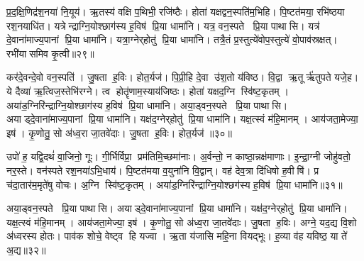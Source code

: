 प्र॒द॒क्षि॒णिद्र॑श॒नया॑ नि॒यूय॑। ऋ॒तस्य॑ वक्षि प॒थिभी॒ रजि॑ष्ठैः। होता॑ यक्षद्वन॒स्पति॑म॒भिहि। पि॒ष्टत॑मया॒ रभि॑ष्ठया रश॒नयाधि॑त। यत्रेन्द्राग्नि॒योश्छाग॑स्य ह॒विष॑ प्रि॒या धामा॑नि। यत्र॒ वन॒स्पते प्रि॒या पाथासि। यत्र॑ दे॒वाना॑माज्य॒पानां प्रि॒या धामा॑नि। यत्रा॒ग्नेर्‌होतु॑ प्रि॒या धामा॑नि। तत्रै॒तं प्र॒स्तुत्ये॑वोप॒स्तुत्ये॑ वो॒पाव॑स्रक्षत्। रभी॑यासमिव कृ॒त्वी॥२९॥

कर॑दे॒वन्दे॒वो वन॒स्पति॑। जु॒षता ह॒विः। होत॒र्यज॑। पि॒प्री॒हि दे॒वा उ॑श॒तो य॑विष्ठ। वि॒द्वा ऋ॒तूर्\mbox{}ऋ॑तुपते यजे॒ह। ये दैव्या॑ ऋ॒त्विज॒स्तेभि॑रग्ने। त्व होतॄ॑णाम॒स्याय॑जिष्ठः। होता॑ यक्षद॒ग्नि स्वि॑ष्ट॒कृतम्। अया॑ड॒ग्निरि॑न्द्राग्नि॒योश्छाग॑स्य ह॒विष॑ प्रि॒या धामा॑नि। अया॒ड्वन॒स्पते प्रि॒या पाथासि। अयाड्दे॒वाना॑माज्य॒पानां प्रि॒या धामा॑नि। यक्ष॑द॒ग्नेर्‌होतु॑ प्रि॒या धामा॑नि। यक्ष॒त्स्वं म॑हि॒मानम्। आय॑जता॒मेज्या॒ इष॑। कृ॒णोतु॒ सो अ॑ध्व॒रा जा॒तवे॑दाः। जु॒षता ह॒विः। होत॒र्यज॑ ॥३०॥\anuvakamend[नू॒नमर्थं॑ कृ॒त्वी पाथासि स॒प्त च॑]

उपो॑ ह॒ यद्वि॒दथं॑ वा॒जिनो॒ गूः। गी॒र्भिर्विप्रा॒ प्रम॑तिमि॒च्छमा॑नाः। अ॒र्वन्तो॒ न काष्ठा॒न्नक्ष॑माणाः। इ॒न्द्रा॒ग्नी जोहु॑वतो॒ नर॒स्ते। वन॑स्पते रश॒नया॑ऽभि॒धाय॑। पि॒ष्टत॑मया व॒युना॑नि वि॒द्वान्। वह॑ देव॒त्रा दि॑धिषो ह॒वीषि॑। प्र च॑दा॒तार॑म॒मृते॑षु वोचः। अ॒ग्नि स्वि॑ष्ट॒कृतम्। अया॑ड॒ग्निरि॑न्द्राग्नि॒योश्छग॑स्य ह॒विष॑ प्रि॒या धामा॑नि॥३१॥

अया॒ड्वन॒स्पते प्रि॒या पाथासि। अयाड्दे॒वाना॑माज्य॒पानां प्रि॒या धामा॑नि। यक्ष॑द॒ग्नेर्‌होतु॑ प्रि॒या धामा॑नि। यक्ष॒त्स्वं म॑हि॒मानम्। आय॑जता॒मेज्या॒ इष॑। कृ॒णोतु॒ सो अ॑ध्व॒रा जा॒तवे॑दाः। जु॒षता ह॒विः। अग्ने॒ यद॒द्य वि॒शो अ॑ध्वरस्य होतः। पाव॑क शोचे॒ वेष्ट्व हि यज्वा। ऋ॒ता य॑जासि महि॒ना वियद्भूः। ह॒व्या व॑ह यविष्ठ॒ या ते॑ अ॒द्य॥३२॥\anuvakamend[धामा॑नि॒ भूरेकं च]

